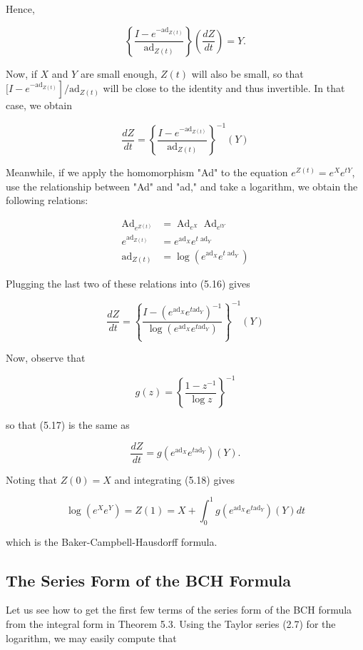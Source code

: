 \documentclass[10pt, letterpaper]{article}
\begin{document}
Hence,

$$
\left\{\frac{I-e^{-\mathrm{ad}_{Z(t)}}}{\operatorname{ad}_{Z(t)}}\right\}\left(\frac{d Z}{d t}\right)=Y .
$$

Now, if $X$ and $Y$ are small enough, $Z(t)$ will also be small, so that $[I- \left.e^{-\mathrm{ad}_{Z(t)}}\right] / \mathrm{ad}_{Z(t)}$ will be close to the identity and thus invertible. In that case, we obtain

$$
\frac{d Z}{d t}=\left\{\frac{I-e^{-\mathrm{ad}_{Z(t)}}}{\operatorname{ad}_{Z(t)}}\right\}^{-1}(Y)
$$

Meanwhile, if we apply the homomorphism "Ad" to the equation $e^{Z(t)}=e^{X} e^{t Y}$, use the relationship between "Ad" and "ad," and take a logarithm, we obtain the following relations:

$$
\begin{aligned}
\operatorname{Ad}_{e^{Z(t)}} & =\operatorname{Ad}_{e^{X}} \operatorname{Ad}_{e^{t Y}} \\
e^{\operatorname{ad}_{Z(t)}} & =e^{\operatorname{ad}_{X}} e^{t \operatorname{ad}_{Y}} \\
\operatorname{ad}_{Z(t)} & =\log \left(e^{\operatorname{ad}_{X}} e^{t \operatorname{ad}_{Y}}\right)
\end{aligned}
$$

Plugging the last two of these relations into (5.16) gives

$$
\frac{d Z}{d t}=\left\{\frac{I-\left(e^{\mathrm{ad}_{X}} e^{t \mathrm{ad}_{Y}}\right)^{-1}}{\log \left(e^{\mathrm{ad}_{X}} e^{t \mathrm{ad}_{Y}}\right)}\right\}^{-1}(Y)
$$

Now, observe that

$$
g(z)=\left\{\frac{1-z^{-1}}{\log z}\right\}^{-1}
$$

so that (5.17) is the same as

$$
\frac{d Z}{d t}=g\left(e^{\mathrm{ad}_{X}} e^{t \mathrm{ad}_{Y}}\right)(Y) .
$$

Noting that $Z(0)=X$ and integrating (5.18) gives

$$
\log \left(e^{X} e^{Y}\right)=Z(1)=X+\int_{0}^{1} g\left(e^{\mathrm{ad}_{X}} e^{t \mathrm{ad}_{Y}}\right)(Y) d t
$$

which is the Baker-Campbell-Hausdorff formula.

\subsection*{The Series Form of the BCH Formula}
Let us see how to get the first few terms of the series form of the BCH formula from the integral form in Theorem 5.3. Using the Taylor series (2.7) for the logarithm, we may easily compute that
\end{document}
